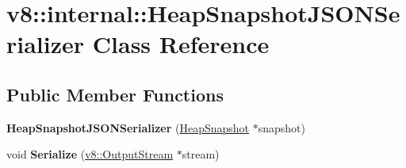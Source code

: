 \hypertarget{classv8_1_1internal_1_1_heap_snapshot_j_s_o_n_serializer}{}\section{v8\+:\+:internal\+:\+:Heap\+Snapshot\+J\+S\+O\+N\+Serializer Class Reference}
\label{classv8_1_1internal_1_1_heap_snapshot_j_s_o_n_serializer}
\subsection*{Public Member Functions}
\begin{DoxyCompactItemize}
\item 
{\bfseries Heap\+Snapshot\+J\+S\+O\+N\+Serializer} (\hyperlink{classv8_1_1internal_1_1_heap_snapshot}{Heap\+Snapshot} $\ast$snapshot)\hypertarget{classv8_1_1internal_1_1_heap_snapshot_j_s_o_n_serializer_acc182676e6b29f094c62ecec8bb3ff5b}{}\label{classv8_1_1internal_1_1_heap_snapshot_j_s_o_n_serializer_acc182676e6b29f094c62ecec8bb3ff5b}

\item 
void {\bfseries Serialize} (\hyperlink{classv8_1_1_output_stream}{v8\+::\+Output\+Stream} $\ast$stream)\hypertarget{classv8_1_1internal_1_1_heap_snapshot_j_s_o_n_serializer_a0cc8e8e97d0a2df0df0f59342ec447a2}{}\label{classv8_1_1internal_1_1_heap_snapshot_j_s_o_n_serializer_a0cc8e8e97d0a2df0df0f59342ec447a2}

\end{DoxyCompactItemize}
